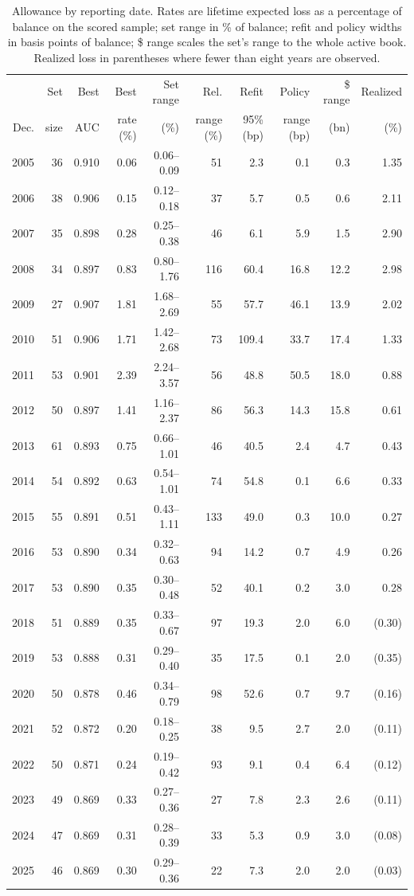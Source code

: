 \begin{table}[H]\centering\footnotesize
\caption{Allowance by reporting date. Rates are lifetime expected loss as a percentage of balance on the scored sample; set range in \% of balance; refit and policy widths in basis points of balance; \$ range scales the set's range to the whole active book. Realized loss in parentheses where fewer than eight years are observed.}\label{tab:bydate}
\setlength{\tabcolsep}{4pt}
\begin{tabular}{rrrrrrrrrr}\toprule
& Set & Best & Best & Set range & Rel. & Refit & Policy & \$ range & Realized \\
Dec. & size & AUC & rate (\%) & (\%) & range (\%) & 95\% (bp) & range (bp) & (bn) & (\%) \\ \midrule
2005 & 36 & 0.910 & 0.06 & 0.06--0.09 & 51 & 2.3 & 0.1 & 0.3 & 1.35 \\
2006 & 38 & 0.906 & 0.15 & 0.12--0.18 & 37 & 5.7 & 0.5 & 0.6 & 2.11 \\
2007 & 35 & 0.898 & 0.28 & 0.25--0.38 & 46 & 6.1 & 5.9 & 1.5 & 2.90 \\
2008 & 34 & 0.897 & 0.83 & 0.80--1.76 & 116 & 60.4 & 16.8 & 12.2 & 2.98 \\
2009 & 27 & 0.907 & 1.81 & 1.68--2.69 & 55 & 57.7 & 46.1 & 13.9 & 2.02 \\
2010 & 51 & 0.906 & 1.71 & 1.42--2.68 & 73 & 109.4 & 33.7 & 17.4 & 1.33 \\
2011 & 53 & 0.901 & 2.39 & 2.24--3.57 & 56 & 48.8 & 50.5 & 18.0 & 0.88 \\
2012 & 50 & 0.897 & 1.41 & 1.16--2.37 & 86 & 56.3 & 14.3 & 15.8 & 0.61 \\
2013 & 61 & 0.893 & 0.75 & 0.66--1.01 & 46 & 40.5 & 2.4 & 4.7 & 0.43 \\
2014 & 54 & 0.892 & 0.63 & 0.54--1.01 & 74 & 54.8 & 0.1 & 6.6 & 0.33 \\
2015 & 55 & 0.891 & 0.51 & 0.43--1.11 & 133 & 49.0 & 0.3 & 10.0 & 0.27 \\
2016 & 53 & 0.890 & 0.34 & 0.32--0.63 & 94 & 14.2 & 0.7 & 4.9 & 0.26 \\
2017 & 53 & 0.890 & 0.35 & 0.30--0.48 & 52 & 40.1 & 0.2 & 3.0 & 0.28 \\
2018 & 51 & 0.889 & 0.35 & 0.33--0.67 & 97 & 19.3 & 2.0 & 6.0 & (0.30) \\
2019 & 53 & 0.888 & 0.31 & 0.29--0.40 & 35 & 17.5 & 0.1 & 2.0 & (0.35) \\
2020 & 50 & 0.878 & 0.46 & 0.34--0.79 & 98 & 52.6 & 0.7 & 9.7 & (0.16) \\
2021 & 52 & 0.872 & 0.20 & 0.18--0.25 & 38 & 9.5 & 2.7 & 2.0 & (0.11) \\
2022 & 50 & 0.871 & 0.24 & 0.19--0.42 & 93 & 9.1 & 0.4 & 6.4 & (0.12) \\
2023 & 49 & 0.869 & 0.33 & 0.27--0.36 & 27 & 7.8 & 2.3 & 2.6 & (0.11) \\
2024 & 47 & 0.869 & 0.31 & 0.28--0.39 & 33 & 5.3 & 0.9 & 3.0 & (0.08) \\
2025 & 46 & 0.869 & 0.30 & 0.29--0.36 & 22 & 7.3 & 2.0 & 2.0 & (0.03) \\
\bottomrule\end{tabular}
\end{table}
